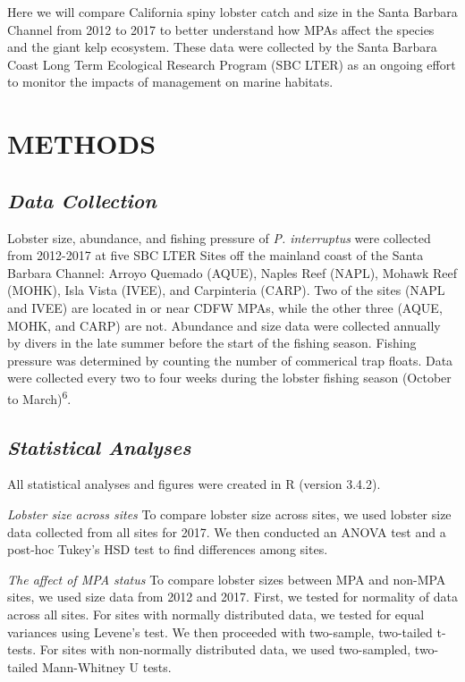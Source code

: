 \documentclass[]{article}
\begin{document}
Here we will compare California spiny lobster catch and size in the
Santa Barbara Channel from 2012 to 2017 to better understand how MPAs
affect the species and the giant kelp ecosystem. These data were
collected by the Santa Barbara Coast Long Term Ecological Research
Program (SBC LTER) as an ongoing effort to monitor the impacts of
management on marine habitats.

\section{METHODS}\label{methods}

\subsection{\texorpdfstring{\emph{Data
Collection}}{Data Collection}}\label{data-collection}

Lobster size, abundance, and fishing pressure of \emph{P. interruptus}
were collected from 2012-2017 at five SBC LTER Sites off the mainland
coast of the Santa Barbara Channel: Arroyo Quemado (AQUE), Naples Reef
(NAPL), Mohawk Reef (MOHK), Isla Vista (IVEE), and Carpinteria (CARP).
Two of the sites (NAPL and IVEE) are located in or near CDFW MPAs, while
the other three (AQUE, MOHK, and CARP) are not. Abundance and size data
were collected annually by divers in the late summer before the start of
the fishing season. Fishing pressure was determined by counting the
number of commerical trap floats. Data were collected every two to four
weeks during the lobster fishing season (October to
March)\textsuperscript{6}.

\subsection{\texorpdfstring{\emph{Statistical
Analyses}}{Statistical Analyses}}\label{statistical-analyses}

All statistical analyses and figures were created in R (version 3.4.2).

\emph{Lobster size across sites} To compare lobster size across sites,
we used lobster size data collected from all sites for 2017. We then
conducted an ANOVA test and a post-hoc Tukey's HSD test to find
differences among sites.

\emph{The affect of MPA status} To compare lobster sizes between MPA and
non-MPA sites, we used size data from 2012 and 2017. First, we tested
for normality of data across all sites. For sites with normally
distributed data, we tested for equal variances using Levene's test. We
then proceeded with two-sample, two-tailed t-tests. For sites with
non-normally distributed data, we used two-sampled, two-tailed
Mann-Whitney U tests.
\end{document}
